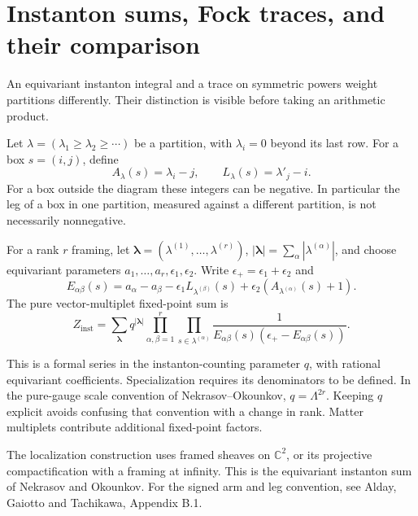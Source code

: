 \section{Instanton sums, Fock traces, and their comparison}

An equivariant instanton integral and a trace on symmetric powers weight
partitions differently. Their distinction is visible before taking an
arithmetic product.

Let $\lambda=(\lambda_1\geq\lambda_2\geq\cdots)$ be a partition, with
$\lambda_i=0$ beyond its last row. For a box $s=(i,j)$, define
\[
 A_\lambda(s)=\lambda_i-j,\qquad
 L_\lambda(s)=\lambda'_j-i.
\]
For a box outside the diagram these integers can be negative. In particular
the leg of a box in one partition, measured against a different partition,
is not necessarily nonnegative.

For a rank $r$ framing, let
$\boldsymbol\lambda=(\lambda^{(1)},\ldots,\lambda^{(r)})$,
$|\boldsymbol\lambda|=\sum_\alpha|\lambda^{(\alpha)}|$, and choose
equivariant parameters $a_1,\ldots,a_r,\epsilon_1,\epsilon_2$. Write
$\epsilon_+=\epsilon_1+\epsilon_2$ and
\[
 E_{\alpha\beta}(s)
  =a_\alpha-a_\beta-\epsilon_1L_{\lambda^{(\beta)}}(s)
                  +\epsilon_2(A_{\lambda^{(\alpha)}}(s)+1).
\]
The pure vector-multiplet fixed-point sum is
\begin{equation}
\label{v4-arith:traces:instanton}
 Z_{\mathrm{inst}}
   =\sum_{\boldsymbol\lambda}q^{|\boldsymbol\lambda|}
     \prod_{\alpha,\beta=1}^r
     \prod_{s\in\lambda^{(\alpha)}}
       \frac1{E_{\alpha\beta}(s)
                    (\epsilon_+-E_{\alpha\beta}(s))}.
\end{equation}

This is a formal series in the instanton-counting parameter $q$, with
rational equivariant coefficients. Specialization requires its denominators
to be defined. In the pure-gauge scale convention of Nekrasov--Okounkov,
$q=\Lambda^{2r}$. Keeping $q$ explicit avoids confusing that convention with
a change in rank. Matter multiplets contribute additional fixed-point
factors.

The localization construction uses framed sheaves on $\mathbb C^2$, or its
projective compactification with a framing at infinity. This is the
equivariant instanton sum of Nekrasov and Okounkov. For the signed arm
and leg convention, see Alday, Gaiotto and Tachikawa, Appendix B.1.

